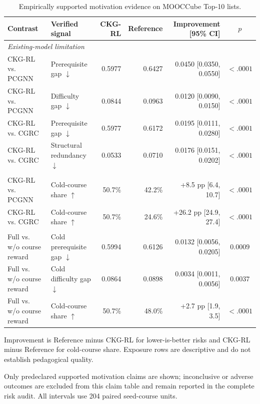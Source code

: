 \begin{table}[t]
\centering
\begin{threeparttable}
\caption{Empirically supported motivation evidence on MOOCCube Top-10 lists.}
\label{tab:p1-motivation-evidence}
\footnotesize
\setlength{\tabcolsep}{4.5pt}
\begin{tabular*}{\textwidth}{@{\extracolsep{\fill}}llrrrc}
\toprule
Contrast & Verified signal & CKG-RL & Reference & Improvement [95\% CI] & $p$ \\
\midrule
\multicolumn{6}{l}{\textit{Existing-model limitation}} \\
CKG-RL vs. PCGNN & Prerequisite gap $\downarrow$ & 0.5977 & 0.6427 & 0.0450 [0.0350, 0.0550] & $<.0001$ \\
CKG-RL vs. PCGNN & Difficulty gap $\downarrow$ & 0.0844 & 0.0963 & 0.0120 [0.0090, 0.0150] & $<.0001$ \\
CKG-RL vs. CGRC & Prerequisite gap $\downarrow$ & 0.5977 & 0.6172 & 0.0195 [0.0111, 0.0280] & $<.0001$ \\
CKG-RL vs. CGRC & Structural redundancy $\downarrow$ & 0.0533 & 0.0710 & 0.0176 [0.0151, 0.0202] & $<.0001$ \\
\addlinespace[1pt]
\multicolumn{6}{l}{\textit{Exposure diagnostic}} \\
CKG-RL vs. PCGNN & Cold-course share $\uparrow$ & 50.7\% & 42.2\% & +8.5 pp [6.4, 10.7] & $<.0001$ \\
CKG-RL vs. CGRC & Cold-course share $\uparrow$ & 50.7\% & 24.6\% & +26.2 pp [24.9, 27.4] & $<.0001$ \\
\addlinespace[1pt]
\multicolumn{6}{l}{\textit{Course-reward mechanism}} \\
Full vs. w/o course reward & Cold prerequisite gap $\downarrow$ & 0.5994 & 0.6126 & 0.0132 [0.0056, 0.0205] & $0.0009$ \\
Full vs. w/o course reward & Cold difficulty gap $\downarrow$ & 0.0864 & 0.0898 & 0.0034 [0.0011, 0.0056] & $0.0037$ \\
Full vs. w/o course reward & Cold-course share $\uparrow$ & 50.7\% & 48.0\% & +2.7 pp [1.9, 3.5] & $<.0001$ \\
\bottomrule
\end{tabular*}
\begin{tablenotes}[flushleft]
\scriptsize
\item Improvement is Reference minus CKG-RL for lower-is-better risks and CKG-RL minus Reference for cold-course share. Exposure rows are descriptive and do not establish pedagogical quality.
\item Only predeclared supported motivation claims are shown; inconclusive or adverse outcomes are excluded from this claim table and remain reported in the complete risk audit. All intervals use 204 paired seed-course units.
\end{tablenotes}
\end{threeparttable}
\end{table}
